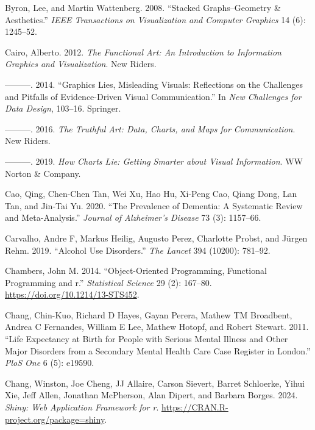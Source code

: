 \documentclass[
  openany]{book}
\newlength{\cslhangindent}
\newenvironment{CSLReferences}[2] %
 {\begin{list}{}{%
  \setlength{\itemindent}{0pt}
  \setlength{\leftmargin}{0pt}
  \setlength{\parsep}{0pt}
  \ifodd #1
   \setlength{\leftmargin}{\cslhangindent}
   \setlength{\itemindent}{-1\cslhangindent}
  \fi
  \setlength{\itemsep}{#2\baselineskip}}}
 {\end{list}}
\theoremstyle{definition}
\theoremstyle{definition}
\theoremstyle{definition}
\theoremstyle{definition}
\theoremstyle{remark}
\begin{document}
\begin{CSLReferences}{1}{0}
Byron, Lee, and Martin Wattenberg. 2008. {``Stacked Graphs--Geometry \& Aesthetics.''} \emph{IEEE Transactions on Visualization and Computer Graphics} 14 (6): 1245--52.

Cairo, Alberto. 2012. \emph{The Functional Art: An Introduction to Information Graphics and Visualization}. New Riders.

---------. 2014. {``Graphics Lies, Misleading Visuals: Reflections on the Challenges and Pitfalls of Evidence-Driven Visual Communication.''} In \emph{New Challenges for Data Design}, 103--16. Springer.

---------. 2016. \emph{The Truthful Art: Data, Charts, and Maps for Communication}. New Riders.

---------. 2019. \emph{How Charts Lie: Getting Smarter about Visual Information}. WW Norton \& Company.

Cao, Qing, Chen-Chen Tan, Wei Xu, Hao Hu, Xi-Peng Cao, Qiang Dong, Lan Tan, and Jin-Tai Yu. 2020. {``The Prevalence of Dementia: A Systematic Review and Meta-Analysis.''} \emph{Journal of Alzheimer's Disease} 73 (3): 1157--66.

Carvalho, Andre F, Markus Heilig, Augusto Perez, Charlotte Probst, and Jürgen Rehm. 2019. {``Alcohol Use Disorders.''} \emph{The Lancet} 394 (10200): 781--92.

Chambers, John M. 2014. {``Object-Oriented Programming, Functional Programming and r.''} \emph{Statistical Science} 29 (2): 167--80. \url{https://doi.org/10.1214/13-STS452}.

Chang, Chin-Kuo, Richard D Hayes, Gayan Perera, Mathew TM Broadbent, Andrea C Fernandes, William E Lee, Mathew Hotopf, and Robert Stewart. 2011. {``Life Expectancy at Birth for People with Serious Mental Illness and Other Major Disorders from a Secondary Mental Health Care Case Register in London.''} \emph{PloS One} 6 (5): e19590.

Chang, Winston, Joe Cheng, JJ Allaire, Carson Sievert, Barret Schloerke, Yihui Xie, Jeff Allen, Jonathan McPherson, Alan Dipert, and Barbara Borges. 2024. \emph{Shiny: Web Application Framework for r}. \url{https://CRAN.R-project.org/package=shiny}.


\end{CSLReferences}
\end{document}
